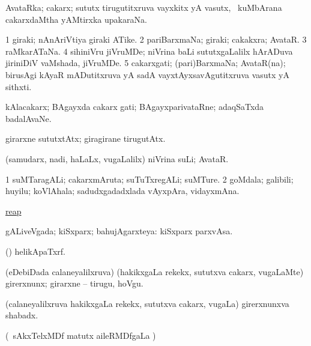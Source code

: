 \bentry
{} 
\gl{\nA}
\expl{}
\bmng
AvataRka; cakarx; sututx tirugutitxruva vayxkitx yA vasutx, \kanmu\ kuMbArana cakarxdaMtha yAMtirxka upakaraNa. 
\emng
\eentry

\bentry
{} 
\gl{\nA}
\expl{}
\bmng
\bnum
\num{1} giraki; nAnAriVtiya giraki ATike. 
\num{2} pariBarxmaNa; giraki; cakakxra; AvataR. 
\num{3} raMkarATaNa. 
\num{4} sihiniVru jiVruMDe; niVrina baLi sututxgaLalilx hArADuva jiriniDiV vaMshada, jiVruMDe. 
\num{5} cakarxgati; (pari)BarxmaNa; AvataR(na); birusAgi kAyaR mADutitxruva yA sadA vayxtAyxsavAgutitxruva vasutx yA sithxti. 
\enum
\emng

\noindent
\gl{\pagu}
\expl{}
\bmng
{} kAlacakarx; BAgayxda cakarx gati; BAgayxparivataRne; adaqSaTxda badalAvaNe. 
\emng
\eentry

\bentry
{} 
\gl{\kirxvi}
\expl{}
\bmng
girarxne sututxtAtx; giragirane tirugutAtx. 
\emng
\eentry

\bentry
{} 
\gl{\nA}
\expl{}
\bmng
(samudarx, nadi, haLaLx, \mo vugaLalilx) niVrina suLi; AvataR. 
\emng
\eentry

\bentry
{} 
\gl{\nA}
\expl{}
\bmng
\bnum
\num{1} suMTaragALi; cakarxmAruta; suTuTxregALi; suMTure. 
\num{2} goMdala; galibili; huyilu; koVlAhala; sadudxgadadxlada vAyxpAra, vidayxmAna. 
\enum
\emng

\noindent
\gl{\pagu}
\expl{}
\bmng
{} \hyperref{kandict_r.pdf}{R}{reap pagu1}{reap}  
\emng
\eentry

\bentry
{}
\gl{\gu}
\expl{}
\bmng
gALiveVgada; kiSxparx; bahujAgarxteya:  kiSxparx parxvAsa. 
\emng
\eentry

\bentry
{} 
\gl{\nA}
\expl{}
\bmng
(\AmA) helikApaTxrf. 
\emng
\eentry

\bentry
{} 
\gl{\akirx}
\bmng
(eDebiDada calaneyalilxruva) (hakikxgaLa rekekx, sututxva cakarx, \mo vugaLaMte) girerxnunx; girarxne -- tirugu, hoVgu. 
\emng
\eentry

\bentry
{} 
\gl{\nA}
\expl{}
\bmng
(calaneyalilxruva hakikxgaLa rekekx, sututxva cakarx, \mo vugaLa) girerxnunxva shabadx. 
\emng
\eentry

\bentry
{} 
\gl{\kirx}
\expl{}
\bmng
(\kanmu\ sAkxTelxMDf matutx aileRMDfgaLa \pArxM) 
\emng

